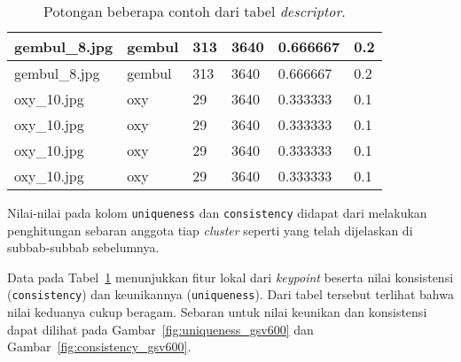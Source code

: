 \begin{table}[H]
\begin{tabular}{|l|l|l|l|l|l|}
		gembul\_8.jpg                      & gembul                                   & 313                                          & 3640                                         & 0.666667                                 & 0.2                                       \\ \hline
		gembul\_8.jpg                      & gembul                                   & 313                                          & 3640                                         & 0.666667                                 & 0.2                                       \\ \hline
		oxy\_10.jpg                        & oxy                                      & 29                                           & 3640                                         & 0.333333                                 & 0.1                                       \\ \hline
		oxy\_10.jpg                        & oxy                                      & 29                                           & 3640                                         & 0.333333                                 & 0.1                                       \\ \hline
		oxy\_10.jpg                        & oxy                                      & 29                                           & 3640                                         & 0.333333                                 & 0.1                                       \\ \hline
		oxy\_10.jpg                        & oxy                                      & 29                                           & 3640                                         & 0.333333                                 & 0.1                                       \\ \hline
	\end{tabular}
	\caption{Potongan beberapa contoh dari tabel \textit{descriptor}.}
	\label{tab:descriptors_table}
\end{table}

Nilai-nilai pada kolom \texttt{uniqueness} dan \texttt{consistency} didapat dari melakukan penghitungan sebaran anggota tiap \textit{cluster} seperti yang telah dijelaskan di subbab-subbab sebelumnya. 

Data pada Tabel~\ref{tab:descriptors_table} menunjukkan fitur lokal dari \textit{keypoint} beserta nilai konsistensi (\texttt{consistency}) dan keunikannya (\texttt{uniqueness}). Dari tabel tersebut terlihat bahwa nilai keduanya cukup beragam. Sebaran untuk nilai keunikan dan konsistensi dapat dilihat pada Gambar~\ref{fig:uniqueness_gsv600} dan Gambar~\ref{fig:consistency_gsv600}.

